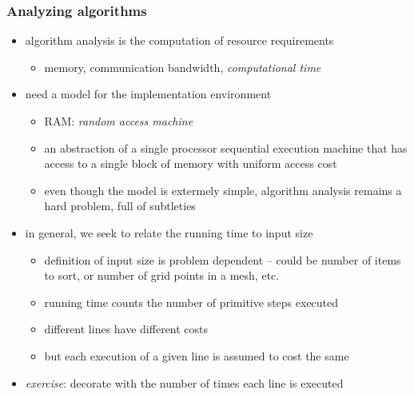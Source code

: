 \begin{frame}[fragile]
%
  \frametitle{Analyzing algorithms}
%
  \begin{itemize}
%
  \item algorithm analysis is the computation of resource requirements
    \begin{itemize}
      \item memory, communication bandwidth, {\em computational time}
    \end{itemize}
%
  \item need a model for the implementation environment
    \begin{itemize}
      \item RAM: {\em random access machine}
      \item an abstraction of a single processor sequential execution machine that has access
        to a single block of memory with uniform access cost
      \item even though the model is extermely simple, algorithm analysis remains a hard
        problem, full of subtleties
    \end{itemize}
%
    \item in general, we seek to relate the running time to input size
      \begin{itemize}
        \item definition of input size is problem dependent -- could be number of items to sort,
          or number of grid points in a mesh, etc.
        \item running time counts the number of primitive steps executed
        \item different lines have different costs
        \item but each execution of a given line is assumed to cost the same
      \end{itemize}
%
    \item {\em exercise}: decorate  with the number of times each line is
      executed
%
  \end{itemize}
%
\end{frame}

